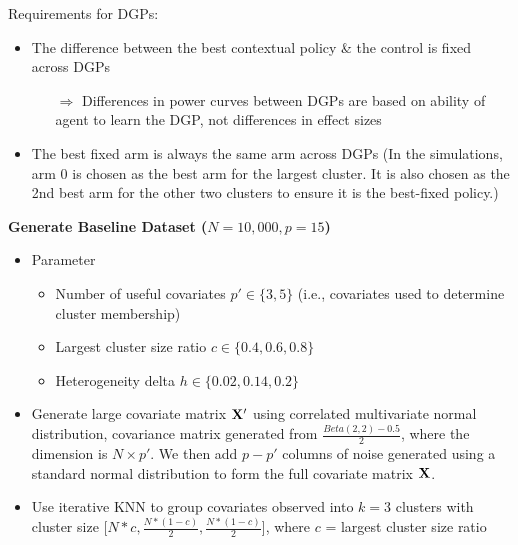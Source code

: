 \documentclass[letterpaper, 12pt, parskip=full,DIV=10]{scrartcl}
\begin{document}
Requirements for DGPs:
\begin{itemize}
    \item The difference between the best contextual policy \& the control is fixed across DGPs
    \begin{itemize}
        \item[$\Rightarrow$] Differences in power curves between DGPs are based on ability of agent to learn the DGP, not differences in effect sizes
    \end{itemize}
    \item The best fixed arm is always the same arm across DGPs (In the simulations, arm 0 is chosen as the best arm for the largest cluster. It is also chosen as the 2nd best arm for the other two clusters to ensure it is the best-fixed policy.)
\end{itemize}


\textbf{Generate Baseline Dataset ($N = 10,000, p = 15$)}
\begin{itemize}
    \item Parameter \begin{itemize}
        \item Number of useful covariates $p' \in \{3, 5\}$ (i.e., covariates used to determine cluster membership)
        \item Largest cluster size ratio $c \in \{0.4, 0.6, 0.8\}$
        \item Heterogeneity delta $h \in \{0.02, 0.14, 0.2\}$
    \end{itemize}
    \item Generate large covariate matrix $\mathbf{X}'$ using correlated multivariate normal distribution, covariance matrix generated from $\frac{Beta(2,2) - 0.5}{2}$, where the dimension is $N \times p'$. We then add $p - p'$ columns of noise generated using a standard normal distribution to form the full covariate matrix $\mathbf{X}$.
    \item Use iterative KNN to group covariates observed into $k = 3$ clusters with cluster size [$N*c, \frac{N * (1-c)}{2}, \frac{N * (1-c)}{2}$], where $c$ = largest cluster size ratio
\end{itemize}
\end{document}
